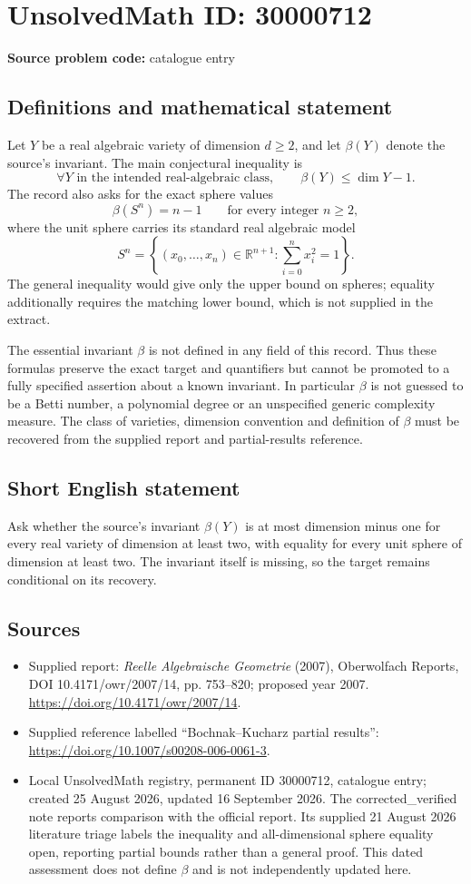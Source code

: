 \documentclass[11pt]{article}
\newcommand{\R}{\mathbb{R}}
\begin{document}
\section*{UnsolvedMath ID: 30000712}
\textbf{Source problem code:} catalogue entry
\subsection{Definitions and mathematical statement}
Let $Y$ be a real algebraic variety of dimension $d\geq2$, and let $\beta(Y)$ denote the source's invariant. The main conjectural inequality is
\[
\forall Y\text{ in the intended real-algebraic class},\qquad
\beta(Y)\leq\dim Y-1.
\]
The record also asks for the exact sphere values
\[
\beta(S^n)=n-1\qquad\text{for every integer }n\geq2,
\]
where the unit sphere carries its standard real algebraic model
\[
S^n=\left\{(x_0,\ldots,x_n)\in\R^{n+1}:\sum_{i=0}^{n}x_i^2=1\right\}.
\]
The general inequality would give only the upper bound on spheres; equality additionally requires the matching lower bound, which is not supplied in the extract.

The essential invariant $\beta$ is not defined in any field of this record. Thus these formulas preserve the exact target and quantifiers but cannot be promoted to a fully specified assertion about a known invariant. In particular $\beta$ is not guessed to be a Betti number, a polynomial degree or an unspecified generic complexity measure. The class of varieties, dimension convention and definition of $\beta$ must be recovered from the supplied report and partial-results reference.
\subsection{Short English statement}
Ask whether the source's invariant $\beta(Y)$ is at most dimension minus one for every real variety of dimension at least two, with equality for every unit sphere of dimension at least two. The invariant itself is missing, so the target remains conditional on its recovery.
\subsection{Sources}
\begin{itemize}
\item Supplied report: \emph{Reelle Algebraische Geometrie} (2007), Oberwolfach Reports, DOI 10.4171/owr/2007/14, pp. 753--820; proposed year 2007. \url{https://doi.org/10.4171/owr/2007/14}.
\item Supplied reference labelled ``Bochnak--Kucharz partial results'': \url{https://doi.org/10.1007/s00208-006-0061-3}.
\item Local UnsolvedMath registry, permanent ID 30000712, catalogue entry; created 25 August 2026, updated 16 September 2026. The corrected\_verified note reports comparison with the official report. Its supplied 21 August 2026 literature triage labels the inequality and all-dimensional sphere equality open, reporting partial bounds rather than a general proof. This dated assessment does not define $\beta$ and is not independently updated here.
\end{itemize}
\end{document}
